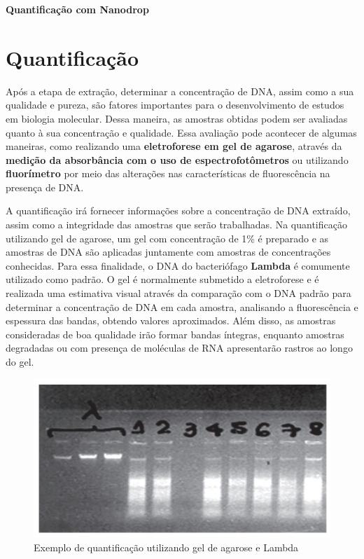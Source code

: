 \documentclass[
  letterpaper,
  DIV=11,
  numbers=noendperiod]{scrreprt}
\begin{document}
\textbf{Quantificação com Nanodrop}

\hypertarget{quantificauxe7uxe3o}{%
\chapter{Quantificação}\label{quantificauxe7uxe3o}}

Após a etapa de extração, determinar a concentração de DNA, assim como a
sua qualidade e pureza, são fatores importantes para o desenvolvimento
de estudos em biologia molecular. Dessa maneira, as amostras obtidas
podem ser avaliadas quanto à sua concentração e qualidade. Essa
avaliação pode acontecer de algumas maneiras, como realizando uma
\textbf{eletroforese em gel de agarose}, através da \textbf{medição da
absorbância com o uso de espectrofotômetros} ou utilizando
\textbf{fluorímetro} por meio das alterações nas características de
fluorescência na presença de DNA.

A quantificação irá fornecer informações sobre a concentração de DNA
extraído, assim como a integridade das amostras que serão trabalhadas.
Na quantificação utilizando gel de agarose, um gel com concentração de
1\% é preparado e as amostras de DNA são aplicadas juntamente com
amostras de concentrações conhecidas. Para essa finalidade, o DNA do
bacteriófago \textbf{Lambda} é comumente utilizado como padrão. O gel é
normalmente submetido a eletroforese e é realizada uma estimativa visual
através da comparação com o DNA padrão para determinar a concentração de
DNA em cada amostra, analisando a fluorescência e espessura das bandas,
obtendo valores aproximados. Além disso, as amostras consideradas de boa
qualidade irão formar bandas íntegras, enquanto amostras degradadas ou
com presença de moléculas de RNA apresentarão rastros ao longo do gel.

\begin{figure}

{\centering \includegraphics{figures/quantificacao.jpg}

}

\caption{Exemplo de quantificação utilizando gel de agarose e Lambda}

\end{figure}
\end{document}
